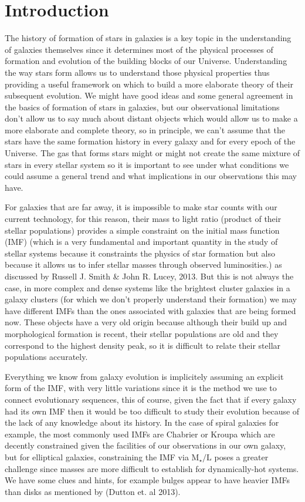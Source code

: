 \chapter{Introduction}

The history of formation of stars in galaxies is a key topic in the understanding of galaxies themselves since it determines most of the physical processes of formation and evolution of the building blocks of our Universe. Understanding the way stars form allows us to understand those physical properties thus providing a useful framework on which to build a more elaborate theory of their subsequent evolution. We might have good ideas and some general agreement in the basics of formation of stars in galaxies, but our observational limitations don't allow us to say much about distant objects which would allow us to make a more elaborate and complete theory, so in principle, we can't assume that the stars have the same formation history in every galaxy and for every epoch of the Universe. The gas that forms stars might or might not create the same mixture of stars in every stellar system so it is important to see under what conditions we could assume a general trend and what implications in our observations this may have. 

For galaxies that are far away, it is impossible to make star counts with our current technology, for this reason, their mass to light ratio (product of their stellar populations) provides a simple constraint on the initial mass function (IMF) (which is a very fundamental and important quantity in the study of stellar systems because it constraints the physics of star formation but also because it allows us to infer stellar masses through observed luminosities.) as  discussed by Russell J. Smith \& John R. Lucey, 2013. But this is not always the case, in more complex and dense systems like the brightest cluster galaxies in a galaxy clusters (for which we don't properly understand their formation) we may have different IMFs than the ones associated with galaxies that are being formed now. These objects have a very old origin because although their build up and morphological formation is recent, their stellar populations are old and they correspond to the highest density peak, so it is difficult to relate their stellar populations accurately.

Everything we know from galaxy evolution is implicitely assuming an explicit form of the IMF, with very little variations since it is the method we use to connect evolutionary sequences, this of course, given the fact that if every galaxy had its own IMF then it would be too difficult to study their evolution because of the lack of any knowledge about its history. In the case of spiral galaxies for example, the most commonly used IMFs are Chabrier or Kroupa which are decently constrained given the facilities of our observations in our own galaxy, but for elliptical galaxies, constraining the IMF via $\textrm{M}_{\star}/\textrm{L}$ poses a greater challenge since masses are more difficult to establish for dynamically-hot systems. We have some clues and hints, for example bulges appear to have heavier IMFs than disks as mentioned by (Dutton et. al 2013).

